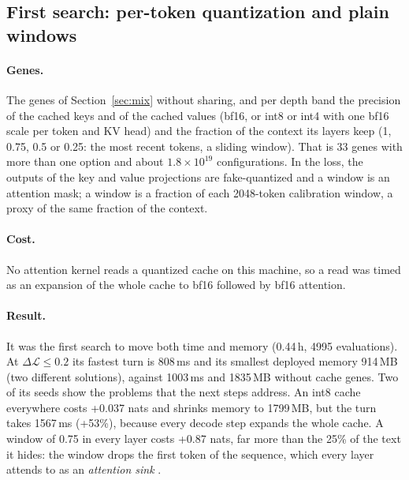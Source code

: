 \documentclass[11pt]{article}
\newcommand{\dloss}{\Delta\mathcal{L}}
\begin{document}
\subsection{First search: per-token quantization and plain windows}
\label{sec:kv1}
\paragraph{Genes.} The genes of Section~\ref{sec:mix} without sharing, and per depth band the precision of
the cached keys and of the cached values (bf16, or int8 or int4 with one bf16 scale per token and KV head)
and the fraction of the context its layers keep (1, 0.75, 0.5 or 0.25: the most recent tokens, a sliding
window). That is 33 genes with more than one option and about $1.8\times10^{19}$ configurations. In the loss,
the outputs of the key and value projections are fake-quantized and a window is an attention mask; a window
is a fraction of each 2048-token calibration window, a proxy of the same fraction of the context.

\paragraph{Cost.} No attention kernel reads a quantized cache on this machine, so a read was timed as an
expansion of the whole cache to bf16 followed by bf16 attention.

\paragraph{Result.} It was the first search to move both time and memory (0.44\,h, 4995 evaluations). At
$\dloss\le0.2$ its fastest turn is 808\,ms and its smallest deployed memory 914\,MB (two different solutions),
against 1003\,ms and 1835\,MB without cache genes. Two of its seeds show the problems that the next steps
address. An int8 cache everywhere costs +0.037 nats and shrinks memory to 1799\,MB, but the turn takes
1567\,ms (+53\%), because every decode step expands the whole cache. A window of 0.75 in every layer costs
+0.87 nats, far more than the 25\% of the text it hides: the window drops the first token of the sequence,
which every layer attends to as an \emph{attention sink} \cite{xiao2024streamingllm}.
\end{document}
